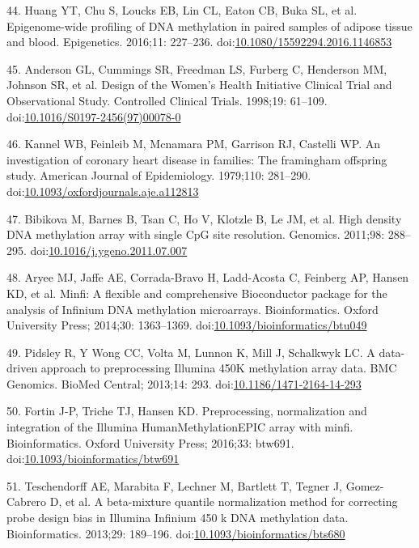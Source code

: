 \documentclass[]{article}
\theoremstyle{definition}
\theoremstyle{definition}
\theoremstyle{definition}
\theoremstyle{remark}
\begin{document}
44. Huang YT, Chu S, Loucks EB, Lin CL, Eaton CB, Buka SL, et al.
Epigenome-wide profiling of DNA methylation in paired samples of adipose
tissue and blood. Epigenetics. 2016;11: 227--236.
doi:\href{http://dx.doi.org/10.1080/15592294.2016.1146853}{10.1080/15592294.2016.1146853}

45. Anderson GL, Cummings SR, Freedman LS, Furberg C, Henderson MM,
Johnson SR, et al. Design of the Women's Health Initiative Clinical
Trial and Observational Study. Controlled Clinical Trials. 1998;19:
61--109.
doi:\href{http://dx.doi.org/10.1016/S0197-2456(97)00078-0}{10.1016/S0197-2456(97)00078-0}

46. Kannel WB, Feinleib M, Mcnamara PM, Garrison RJ, Castelli WP. An
investigation of coronary heart disease in families: The framingham
offspring study. American Journal of Epidemiology. 1979;110: 281--290.
doi:\href{http://dx.doi.org/10.1093/oxfordjournals.aje.a112813}{10.1093/oxfordjournals.aje.a112813}

47. Bibikova M, Barnes B, Tsan C, Ho V, Klotzle B, Le JM, et al. High
density DNA methylation array with single CpG site resolution. Genomics.
2011;98: 288--295.
doi:\href{http://dx.doi.org/10.1016/j.ygeno.2011.07.007}{10.1016/j.ygeno.2011.07.007}

48. Aryee MJ, Jaffe AE, Corrada-Bravo H, Ladd-Acosta C, Feinberg AP,
Hansen KD, et al. Minfi: A flexible and comprehensive Bioconductor
package for the analysis of Infinium DNA methylation microarrays.
Bioinformatics. Oxford University Press; 2014;30: 1363--1369.
doi:\href{http://dx.doi.org/10.1093/bioinformatics/btu049}{10.1093/bioinformatics/btu049}

49. Pidsley R, {Y Wong} CC, Volta M, Lunnon K, Mill J, Schalkwyk LC. A
data-driven approach to preprocessing Illumina 450K methylation array
data. BMC Genomics. BioMed Central; 2013;14: 293.
doi:\href{http://dx.doi.org/10.1186/1471-2164-14-293}{10.1186/1471-2164-14-293}

50. Fortin J-P, Triche TJ, Hansen KD. Preprocessing, normalization and
integration of the Illumina HumanMethylationEPIC array with minfi.
Bioinformatics. Oxford University Press; 2016;33: btw691.
doi:\href{http://dx.doi.org/10.1093/bioinformatics/btw691}{10.1093/bioinformatics/btw691}

51. Teschendorff AE, Marabita F, Lechner M, Bartlett T, Tegner J,
Gomez-Cabrero D, et al. A beta-mixture quantile normalization method for
correcting probe design bias in Illumina Infinium 450 k DNA methylation
data. Bioinformatics. 2013;29: 189--196.
doi:\href{http://dx.doi.org/10.1093/bioinformatics/bts680}{10.1093/bioinformatics/bts680}
\end{document}
